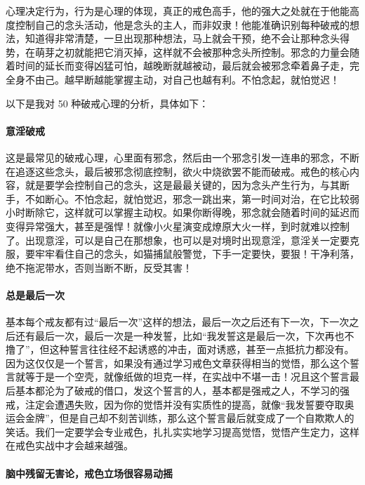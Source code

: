 心理决定行为，行为是心理的体现，真正的戒色高手，他的强大之处就在于他能高度控制自己的念头活动，他是念头的主人，而非奴隶！他能准确识别每种破戒的想法，知道得非常清楚，一旦出现那种想法，马上就会干预，绝不会让那种念头得势，在萌芽之初就能把它消灭掉，这样就不会被那种念头所控制。邪念的力量会随着时间的延长而变得凶猛可怕，越晚断就越被动，最后就会被邪念牵着鼻子走，完全身不由己。越早断越能掌握主动，对自己也越有利。不怕念起，就怕觉迟！

以下是我对 50 种破戒心理的分析，具体如下：

\paragraph{意淫破戒}

这是最常见的破戒心理，心里面有邪念，然后由一个邪念引发一连串的邪念，不断在追逐这些念头，最后被邪念彻底控制，欲火中烧欲罢不能而破戒。戒色的核心内容，就是要学会控制自己的念头，这是最最关键的，因为念头产生行为，与其断手，不如断心。不怕念起，就怕觉迟，邪念一跳出来，第一时间对治，在它比较弱小时断除它，这样就可以掌握主动权。如果你断得晚，邪念就会随着时间的延迟而变得异常强大，甚至是强悍！就像小火星演变成燎原大火一样，到时就难以控制了。出现意淫，可以是自己在那想象，也可以是对境时出现意淫，意淫关一定要克服，要牢牢看住自己的念头，如猫捕鼠般警觉，下手一定要快，要狠！干净利落，绝不拖泥带水，否则当断不断，反受其害！

\paragraph{总是最后一次}

基本每个戒友都有过“最后一次”这样的想法，最后一次之后还有下一次，下一次之后还有最后一次，最后一次是一种发誓，比如“我发誓这是最后一次，下次再也不撸了”，但这种誓言往往经不起诱惑的冲击，面对诱惑，甚至一点抵抗力都没有。因为这仅仅是一个誓言，如果没有通过学习戒色文章获得相当的觉悟，那么这个誓言就等于是一个空壳，就像纸做的坦克一样，在实战中不堪一击！况且这个誓言最后基本都沦为了破戒的借口，发这个誓言的人，基本都是强戒之人，不学习的强戒，注定会遭遇失败，因为你的觉悟并没有实质性的提高，就像“我发誓要夺取奥运会金牌”，但是自己却不刻苦训练，那么这个誓言最后就变成了一个自欺欺人的笑话。我们一定要学会专业戒色，扎扎实实地学习提高觉悟，觉悟产生定力，这样在戒色实战中才会越来越强。

\paragraph{脑中残留无害论，戒色立场很容易动摇}


